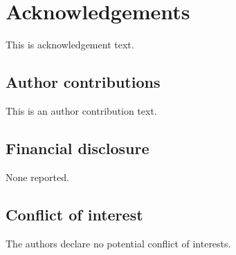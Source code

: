 \documentclass[AMA,STIX1COL]{WileyNJD-v2}
\begin{document}



\section*{Acknowledgements}
This is acknowledgement text.

\subsection*{Author contributions}

This is an author contribution text.

\subsection*{Financial disclosure}

None reported.

\subsection*{Conflict of interest}

The authors declare no potential conflict of interests.




\newpage






\end{document}
